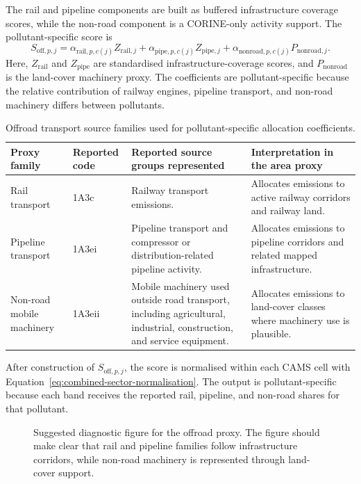 The rail and pipeline components are built as buffered infrastructure
coverage scores, while the non-road component is a CORINE-only activity
support. The pollutant-specific score is
\begin{equation}
  S_{\mathrm{off},p,j} =
  \alpha_{\mathrm{rail},p,c(j)} Z_{\mathrm{rail},j}
  + \alpha_{\mathrm{pipe},p,c(j)} Z_{\mathrm{pipe},j}
  + \alpha_{\mathrm{nonroad},p,c(j)} P_{\mathrm{nonroad},j}.
  \label{eq:offroad-composite}
\end{equation}
Here, $Z_{\mathrm{rail}}$ and $Z_{\mathrm{pipe}}$ are standardised
infrastructure-coverage scores, and $P_{\mathrm{nonroad}}$ is the
land-cover machinery proxy. The coefficients are pollutant-specific
because the relative contribution of railway engines, pipeline transport,
and non-road machinery differs between pollutants.

\begin{table}[htbp]
  \centering
  \caption{Offroad transport source families used for pollutant-specific allocation coefficients.}
  \label{tab:offroad-alpha-groups}
  \scriptsize
  \begin{tabular}{p{} p{} p{} p{}}
    \toprule
    Proxy family & Reported code & Reported source groups represented & Interpretation in the area proxy \\
    \midrule
    Rail transport &
    1A3c &
    Railway transport emissions. &
    Allocates emissions to active railway corridors and railway land. \\
    Pipeline transport &
    1A3ei &
    Pipeline transport and compressor or distribution-related pipeline activity. &
    Allocates emissions to pipeline corridors and related mapped infrastructure. \\
    Non-road mobile machinery &
    1A3eii &
    Mobile machinery used outside road transport, including agricultural, industrial, construction, and service equipment. &
    Allocates emissions to land-cover classes where machinery use is plausible. \\
    \bottomrule
  \end{tabular}
\end{table}

After construction of $S_{\mathrm{off},p,j}$, the score is normalised
within each CAMS cell with Equation~\ref{eq:combined-sector-normalisation}.
The output is pollutant-specific because each band receives the reported
rail, pipeline, and non-road shares for that pollutant.

\begin{figure}[htbp]
  \centering
  \caption{Suggested diagnostic figure for the offroad proxy. The figure
  should make clear that rail and pipeline families follow infrastructure
  corridors, while non-road machinery is represented through land-cover
  support.}
  \label{fig:offroad-combined-proxy-placeholder}
\end{figure}
